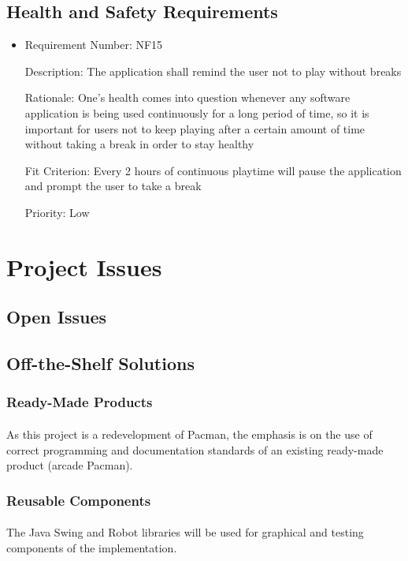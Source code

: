 \documentclass[12pt, titlepage]{article}
\begin{document}
\subsection{Health and Safety Requirements}
\begin{itemize}
	\item
	Requirement Number: NF15

	Description: The application shall remind the user not to play without breaks

	Rationale: One's health comes into question whenever any software application is being used continuously for a long period of time, so it is important for users not to keep playing after a certain amount of time without taking a break in order to stay healthy

	Fit Criterion: Every 2 hours of continuous playtime will pause the application and prompt the user to take a break

	Priority: Low
\end{itemize}

\section{Project Issues}

\subsection{Open Issues}

\subsection{Off-the-Shelf Solutions}

\subsubsection{Ready-Made Products}
\paragraph{}
As this project is a redevelopment of Pacman, the emphasis is on the use of correct programming and documentation standards of an existing ready-made product (arcade Pacman).

\subsubsection{Reusable Components}
\paragraph{}
The Java Swing and Robot libraries will be used for graphical and testing components of the implementation.
\end{document}
